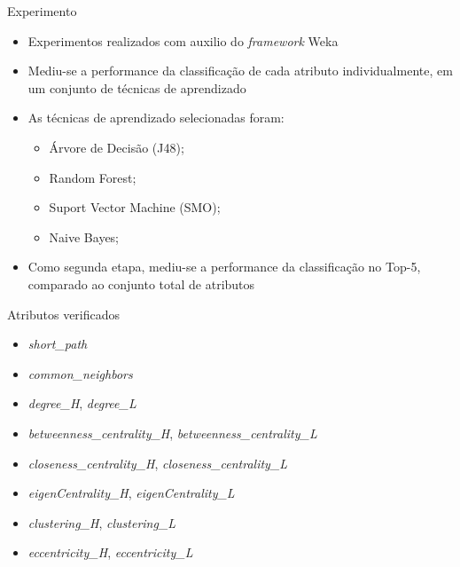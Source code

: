 \documentclass{beamer}
\begin{document}
\begin{frame}{Experimento}
	\begin{itemize}
		\item Experimentos realizados com auxilio do \textit{framework} Weka
		\item Mediu-se a performance da classificação de cada atributo individualmente, em um conjunto de técnicas de aprendizado
		\item As técnicas de aprendizado selecionadas foram:
		\begin{itemize}
			\item Árvore de Decisão (J48);
			\item Random Forest;
			\item Suport Vector Machine (SMO);
			\item Naive Bayes;
		\end{itemize}
		\item Como segunda etapa, mediu-se a performance da classificação no Top-5, comparado ao conjunto total de atributos
	\end{itemize}	
\end{frame}

\begin{frame}{Atributos verificados}
	\begin{itemize}
		\item \textit{short\_path}
		\item \textit{common\_neighbors}
		\item \textit{degree\_H}, \textit{degree\_L}
		\item \textit{betweenness\_centrality\_H}, \textit{betweenness\_centrality\_L}
		\item \textit{closeness\_centrality\_H}, \textit{closeness\_centrality\_L}
		\item \textit{eigenCentrality\_H}, \textit{eigenCentrality\_L}
		\item \textit{clustering\_H}, \textit{clustering\_L}
		\item \textit{eccentricity\_H}, \textit{eccentricity\_L}
	\end{itemize}
\end{frame}
\end{document}
